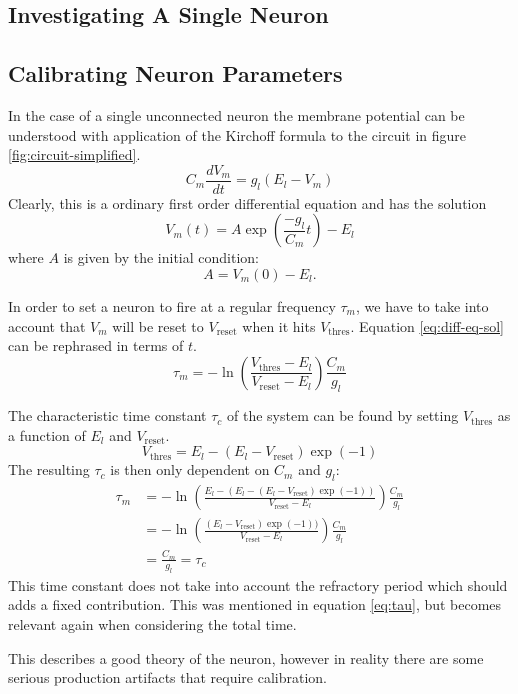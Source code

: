 \documentclass[10pt,a4paper]{article}
\begin{document}
\subsection{Investigating A Single Neuron}

\subsection{Calibrating Neuron Parameters}
In the case of a single unconnected neuron the membrane potential can be
understood with application of the Kirchoff formula to the circuit in figure
\ref{fig:circuit-simplified}.
\[
    C_m \frac{dV_m}{dt} = g_l(E_l - V_m)
\]
Clearly, this is a ordinary first order differential equation and has the
solution
\begin{equation}
    V_m(t) = A \exp(\frac{-g_l}{C_m}t) - E_l
    \label{eq:diff-eq-sol}
\end{equation}
where $A$ is given by the initial condition:
\[
    A = V_m(0) - E_l.
\]

In order to set a neuron to fire at a regular frequency $\tau_m$, we have to take
into account that $V_m$ will be reset to $V_\text{reset}$ when it hits
$V_\text{thres}$. Equation \eqref{eq:diff-eq-sol} can be rephrased in terms of
$t$.
\begin{equation}
    \tau_m = -\ln(\frac{V_\text{thres} - E_l}{V_\text{reset} - E_l})
    \frac{C_m}{g_l}
    \label{eq:tau}
\end{equation}

The characteristic time constant $\tau_c$ of the system can be found by setting
$V_\text{thres}$ as a function of $E_l$ and $V_\text{reset}$.
\[
    V_\text{thres} = E_l - (E_l - V_\text{reset})\exp(-1)
\]
The resulting $\tau_c$ is then only dependent on $C_m$ and $g_l$:
\begin{align*}
    \tau_m &= -\ln(\frac{E_l - (E_l - (E_l - V_\text{reset})\exp(-1))}{V_\text{reset} - E_l}) \frac{C_m}{g_l}\\
           &= -\ln(\frac{(E_l - V_\text{reset})\exp(-1))}{V_\text{reset} - E_l})\frac{C_m}{g_l} \\
           &= \frac{C_m}{g_l} = \tau_c
\end{align*}
This time constant does not take into account the refractory period which should
adds a fixed contribution. This was mentioned in equation \eqref{eq:tau}, but
becomes relevant again when considering the total time.

This describes a good theory of the neuron, however in reality there are some
serious production artifacts that require calibration.
\end{document}
